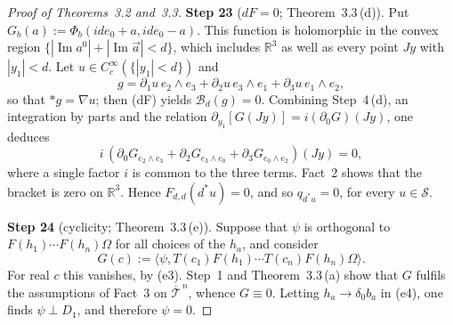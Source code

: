 \documentclass[11pt]{amsart}
\theoremstyle{definition}
\begin{document}
\begin{proof}[Proof of Theorems~3.2 and~3.3]
\textbf{Step 23} ($dF=0$; Theorem~3.3\,(d)).
Put $G_b(a):=\Phi_b(ide_0+a,ide_0-a)$.
This function is holomorphic in the convex region $\{|\operatorname{Im}a^0|+|\operatorname{Im}\vec a|<d\}$, which includes $\mathbb R^3$ as well as every point $Jy$ with $|y_1|<d$.
Let $u\in C_c^\infty(\{|y_1|<d\})$ and
\begin{equation*}
g=\partial_1u\,e_2\wedge e_3+\partial_2u\,e_3\wedge e_1+\partial_3u\,e_1\wedge e_2,
\end{equation*}
so that $\ast g=\nabla u$; then (dF) yields $\mathcal B_d(g)=0$.
Combining Step~4\,(d), an integration by parts and the relation $\partial_{y_1}[G(Jy)]=i(\partial_0G)(Jy)$, one deduces
\begin{equation*}
i\,(\partial_0G_{e_2\wedge e_3}+\partial_2G_{e_3\wedge e_0}+\partial_3G_{e_0\wedge e_2})(Jy)=0,
\end{equation*}
where a single factor $i$ is common to the three terms.
Fact~2 shows that the bracket is zero on $\mathbb R^3$.
Hence $F_{d,d}(d^*u)=0$, and so $q_{d^*u}=0$, for every $u\in\mathcal S$.

\textbf{Step 24} (cyclicity; Theorem~3.3\,(e)).
Suppose that $\psi$ is orthogonal to $F(h_1)\cdots F(h_n)\Omega$ for all choices of the $h_a$, and consider
\begin{equation*}
G(c):=\langle\psi,T(c_1)F(h_1)\cdots T(c_n)F(h_n)\Omega\rangle.
\end{equation*}
For real $c$ this vanishes, by (e3).
Step~1 and Theorem~3.3\,(a) show that $G$ fulfils the assumptions of Fact~3 on $\overline{\mathcal T}^{\,n}$, whence $G\equiv0$.
Letting $h_a\to\delta_0b_a$ in (e4), one finds $\psi\perp D_1$, and therefore $\psi=0$.


\end{proof}
\end{document}
